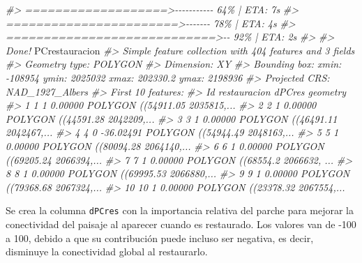 \documentclass[
]{book}
\newenvironment{Shaded}{\begin{snugshade}}{\end{snugshade}}
\newcommand{\CommentTok}[1]{\textcolor[rgb]{0.56,0.35,0.01}{\textit{#1}}}
\newcommand{\NormalTok}[1]{#1}
\begin{document}
\begin{Shaded}
\begin{Highlighting}[]
\CommentTok{\#\textgreater{}  ===================\textgreater{}{-}{-}{-}{-}{-}{-}{-}{-}{-}{-}{-}   64\% |  ETA:  7s}
\CommentTok{\#\textgreater{}  =======================\textgreater{}{-}{-}{-}{-}{-}{-}{-}   78\% |  ETA:  4s}
\CommentTok{\#\textgreater{}  ============================\textgreater{}{-}{-}   92\% |  ETA:  2s}
\CommentTok{\#\textgreater{} }
\CommentTok{\#\textgreater{} Done!}
\NormalTok{PCrestauracion}
\CommentTok{\#\textgreater{} Simple feature collection with 404 features and 3 fields}
\CommentTok{\#\textgreater{} Geometry type: POLYGON}
\CommentTok{\#\textgreater{} Dimension:     XY}
\CommentTok{\#\textgreater{} Bounding box:  xmin: {-}108954 ymin: 2025032 xmax: 202330.2 ymax: 2198936}
\CommentTok{\#\textgreater{} Projected CRS: NAD\_1927\_Albers}
\CommentTok{\#\textgreater{} First 10 features:}
\CommentTok{\#\textgreater{}    Id restauracion    dPCres                       geometry}
\CommentTok{\#\textgreater{} 1   1            1   0.00000 POLYGON ((54911.05 2035815,...}
\CommentTok{\#\textgreater{} 2   2            1   0.00000 POLYGON ((44591.28 2042209,...}
\CommentTok{\#\textgreater{} 3   3            1   0.00000 POLYGON ((46491.11 2042467,...}
\CommentTok{\#\textgreater{} 4   4            0 {-}36.02491 POLYGON ((54944.49 2048163,...}
\CommentTok{\#\textgreater{} 5   5            1   0.00000 POLYGON ((80094.28 2064140,...}
\CommentTok{\#\textgreater{} 6   6            1   0.00000 POLYGON ((69205.24 2066394,...}
\CommentTok{\#\textgreater{} 7   7            1   0.00000 POLYGON ((68554.2 2066632, ...}
\CommentTok{\#\textgreater{} 8   8            1   0.00000 POLYGON ((69995.53 2066880,...}
\CommentTok{\#\textgreater{} 9   9            1   0.00000 POLYGON ((79368.68 2067324,...}
\CommentTok{\#\textgreater{} 10 10            1   0.00000 POLYGON ((23378.32 2067554,...}
\end{Highlighting}
\end{Shaded}

Se crea la columna \texttt{dPCres} con la importancia relativa del parche para mejorar la conectividad del paisaje al aparecer cuando es restaurado. Los valores van de -100 a 100, debido a que su contribución puede incluso ser negativa, es decir, disminuye la conectividad global al restaurarlo.
\end{document}
